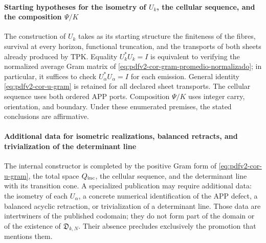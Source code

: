 \paragraph{Starting hypotheses for the isometry of \(U_k\), the cellular sequence, and the composition \(\Psi/K\)}
The construction of \(U_k\) takes as its starting structure the finiteness of the fibres, survival at every horizon, functional truncation, and the transports of both sheets already produced by TPK\@. Equality \(U_k^*U_k=I\) is equivalent to verifying the normalized average Gram matrix of \eqref{eq:pdfv2-cor-gram-promedio-normalizado}; in particular, it suffices to check \(U_\alpha^*U_\alpha=I\) for each emission. General identity \eqref{eq:pdfv2-cor-u-gram} is retained for all declared sheet transports. The cellular sequence uses both ordered APP ports. Composition \(\Psi/K\) uses integer carry, orientation, and boundary. Under these enumerated premises, the stated conclusions are affirmative.

\paragraph{Additional data for isometric realizations, balanced retracts, and trivialization of the determinant line}
The internal constructor is completed by the positive Gram form of
\eqref{eq:pdfv2-cor-u-gram}, the total space \(Q_{\rm inc}\), the cellular sequence,
and the determinant line with its transition cone. A specialized
publication may require additional data: the isometry of each
\(U_\alpha\), a concrete numerical identification of the APP defect, a
balanced acyclic retraction, or trivialization of a determinant
line. Those data are intertwiners of the published codomain; they do not
form part of the domain or of the existence of
\(\mathfrak D_{k,N}\). Their absence precludes exclusively the promotion that
mentions them.


